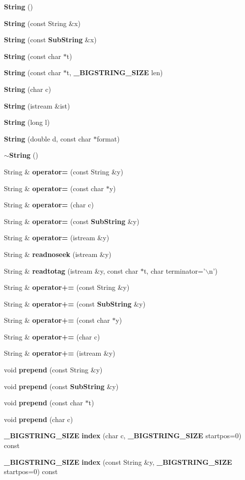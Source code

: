 \begin{CompactItemize}
\item 
{\bf String} ()
\item 
{\bf String} (const String \&x)
\item 
{\bf String} (const {\bf Sub\-String} \&x)
\item 
{\bf String} (const char $\ast$t)
\item 
{\bf String} (const char $\ast$t, {\bf \_\-BIGSTRING\_\-SIZE} len)
\item 
{\bf String} (char c)
\item 
{\bf String} (istream \&ist)
\item 
{\bf String} (long l)
\item 
{\bf String} (double d, const char $\ast$format)
\item 
{\bf $\sim$String} ()
\item 
String \& {\bf operator=} (const String \&y)
\item 
String \& {\bf operator=} (const char $\ast$y)
\item 
String \& {\bf operator=} (char c)
\item 
String \& {\bf operator=} (const {\bf Sub\-String} \&y)
\item 
String \& {\bf operator=} (istream \&y)
\item 
String \& {\bf readnoseek} (istream \&y)
\item 
String \& {\bf readtotag} (istream \&y, const char $\ast$t, char terminator='$\backslash$n')
\item 
String \& {\bf operator+=} (const String \&y)
\item 
String \& {\bf operator+=} (const {\bf Sub\-String} \&y)
\item 
String \& {\bf operator+=} (const char $\ast$y)
\item 
String \& {\bf operator+=} (char c)
\item 
String \& {\bf operator+=} (istream \&y)
\item 
void {\bf prepend} (const String \&y)
\item 
void {\bf prepend} (const {\bf Sub\-String} \&y)
\item 
void {\bf prepend} (const char $\ast$t)
\item 
void {\bf prepend} (char c)
\item 
{\bf \_\-BIGSTRING\_\-SIZE} {\bf index} (char c, {\bf \_\-BIGSTRING\_\-SIZE} startpos=0) const
\item 
{\bf \_\-BIGSTRING\_\-SIZE} {\bf index} (const String \&y, {\bf \_\-BIGSTRING\_\-SIZE} startpos=0) const

\end{CompactItemize}
